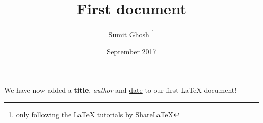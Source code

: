 \documentclass[12pt, letterpaper]{article}
\title{First document}
\author{Sumit Ghosh \thanks{only following the LaTeX tutorials by ShareLaTeX}}
\date{September 2017}
\begin{document}
\maketitle

We have now added a \textbf{title}, \textit{author} and \underline{date} to our first \LaTeX{} document!
\end{document}
